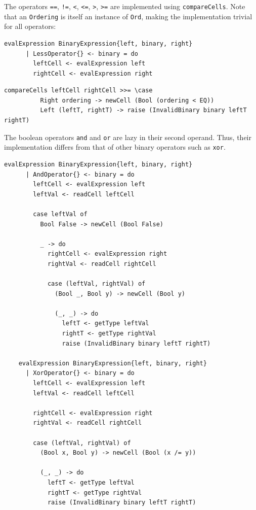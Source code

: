\documentclass[UdineBachThesis,american,11pt]{PhdThesis}
\begin{document}
  The operators \mbox{\texttt{==}}, \mbox{\texttt{!=}}, \texttt{<},
  \mbox{\texttt{<=}}, \texttt{>}, \mbox{\texttt{>=}} are implemented using
  \mbox{\texttt{compareCells}}. Note that an \mbox{\texttt{Ordering}} is itself
  an instance of \mbox{\texttt{Ord}}, making the implementation trivial for all
  operators:

  \begin{Verbatim}[gobble=4,fontsize=\small]
    evalExpression BinaryExpression{left, binary, right}
      | LessOperator{} <- binary = do
        leftCell <- evalExpression left
        rightCell <- evalExpression right
  \end{Verbatim}

  \pagebreak

  \begin{Verbatim}[gobble=4,fontsize=\small]
        compareCells leftCell rightCell >>= \case
          Right ordering -> newCell (Bool (ordering < EQ))
          Left (leftT, rightT) -> raise (InvalidBinary binary leftT rightT)
  \end{Verbatim}

  The boolean operators \mbox{\texttt{and}} and \mbox{\texttt{or}} are lazy in
  their second operand. Thus, their implementation differs from that of other
  binary operators such as \mbox{\texttt{xor}}.

  \begin{Verbatim}[gobble=4,fontsize=\small]
    evalExpression BinaryExpression{left, binary, right}
      | AndOperator{} <- binary = do
        leftCell <- evalExpression left
        leftVal <- readCell leftCell

        case leftVal of
          Bool False -> newCell (Bool False)

          _ -> do
            rightCell <- evalExpression right
            rightVal <- readCell rightCell

            case (leftVal, rightVal) of
              (Bool _, Bool y) -> newCell (Bool y)

              (_, _) -> do
                leftT <- getType leftVal
                rightT <- getType rightVal
                raise (InvalidBinary binary leftT rightT)

    evalExpression BinaryExpression{left, binary, right}
      | XorOperator{} <- binary = do
        leftCell <- evalExpression left
        leftVal <- readCell leftCell

        rightCell <- evalExpression right
        rightVal <- readCell rightCell

        case (leftVal, rightVal) of
          (Bool x, Bool y) -> newCell (Bool (x /= y))

          (_, _) -> do
            leftT <- getType leftVal
            rightT <- getType rightVal
            raise (InvalidBinary binary leftT rightT)
  \end{Verbatim}
\end{document}
